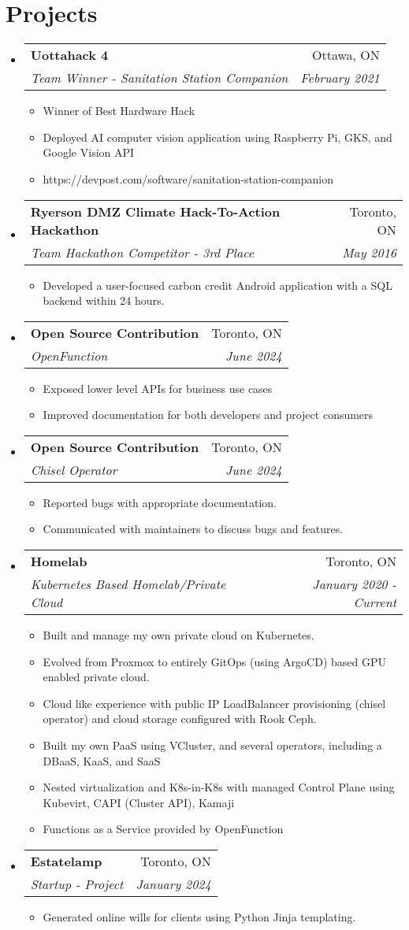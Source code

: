 \documentclass[letterpaper,11pt]{article}
\makeatletter
\newcommand{\resumeItem}[2]{
  \item\small{
    \textbf{#1}{#2 \vspace{-2pt}}
  }
}
\newcommand{\resumeSubheading}[4]{
  \vspace{-1pt}\item
    \begin{tabular*}{0.97\textwidth}[t]{l@{\extracolsep{\fill}}r}
      \textbf{#1} & #2 \\
      \textit{\small#3} & \textit{\small #4} \\
    \end{tabular*}\vspace{-5pt}
}
\newcommand{\resumeSubHeadingListStart}{\begin{itemize}[leftmargin=*]}
\newcommand{\resumeSubHeadingListEnd}{\end{itemize}}
\newcommand{\resumeItemListStart}{\begin{itemize}}
\newcommand{\resumeItemListEnd}{\end{itemize}\vspace{-5pt}}
\makeatother
\begin{document}
\section{Projects}
\resumeSubHeadingListStart
  \resumeSubheading
  {Uottahack 4}{Ottawa, ON}
  {Team Winner - Sanitation Station Companion}{February 2021}
    \resumeItemListStart
      \resumeItem{}
      {Winner of Best Hardware Hack}
      \resumeItem{}
      {Deployed AI computer vision application using Raspberry Pi, GKS, and Google Vision API}
      \resumeItem{}
      {https://devpost.com/software/sanitation-station-companion}
    \resumeItemListEnd
  \resumeSubheading
  {Ryerson DMZ Climate Hack-To-Action Hackathon}{Toronto, ON}
  {Team Hackathon Competitor - 3rd Place}{May 2016}
    \resumeItemListStart
      \resumeItem{}
      {Developed a user-focused carbon credit Android application with a SQL backend within 24 hours.}
    \resumeItemListEnd
  \resumeSubheading
  {Open Source Contribution}{Toronto, ON}
  {OpenFunction}{June 2024}
    \resumeItemListStart
      \resumeItem{}
      {Exposed lower level APIs for business use cases}
      \resumeItem{}
      {Improved documentation for both developers and project consumers}
    \resumeItemListEnd
  \resumeSubheading
  {Open Source Contribution}{Toronto, ON}
  {Chisel Operator}{June 2024}
    \resumeItemListStart
      \resumeItem{}
      {Reported bugs with appropriate documentation.}
      \resumeItem{}
      {Communicated with maintainers to discuss bugs and features.}
    \resumeItemListEnd
  \resumeSubheading
  {Homelab}{Toronto, ON}
  {Kubernetes Based Homelab/Private Cloud}{January 2020 - Current}
    \resumeItemListStart
      \resumeItem{}
      {Built and manage my own private cloud on Kubernetes.}
      \resumeItem{}
      {Evolved from Proxmox to entirely GitOps (using ArgoCD) based GPU enabled private cloud.}
      \resumeItem{}
      {Cloud like experience with public IP LoadBalancer provisioning (chisel operator) and cloud storage configured with Rook Ceph.}
      \resumeItem{}
      {Built my own PaaS using VCluster, and several operators, including a DBaaS, KaaS, and SaaS}
      \resumeItem{}
      {Nested virtualization and K8s-in-K8s with managed Control Plane using Kubevirt, CAPI (Cluster API), Kamaji}
      \resumeItem{}
      {Functions as a Service provided by OpenFunction}
    \resumeItemListEnd
  \resumeSubheading
  {Estatelamp}{Toronto, ON}
  {Startup - Project}{January 2024}
    \resumeItemListStart
      \resumeItem{}
      {Generated online wills for clients using Python Jinja templating.}
    \resumeItemListEnd
\resumeSubHeadingListEnd

\end{document}
